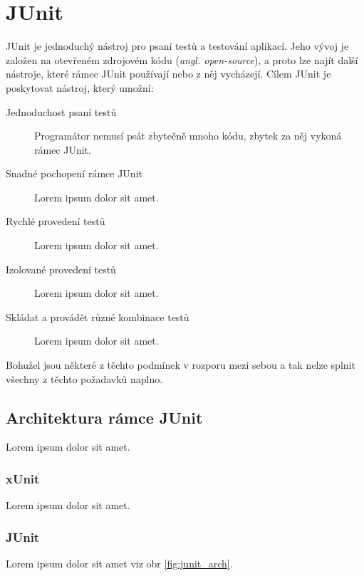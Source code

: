 \chapter{JUnit}                                                           %

JUnit je jednoduchý nástroj pro psaní testů a testování aplikací. Jeho vývoj je založen na otevřeném zdrojovém kódu (\emph{angl. open-source}), a proto lze najít další nástroje, které rámec JUnit používají nebo z něj vycházejí. Cílem JUnit je poskytovat nástroj, který umožní:
\begin{description}
  \item[Jednoduchost psaní testů]
  Programátor nemusí psát zbytečně mnoho kódu, zbytek za něj vykoná rámec JUnit.
  \item[Snadné pochopení rámce JUnit]
  Lorem ipsum dolor sit amet.
  \item[Rychlé provedení testů]
  Lorem ipsum dolor sit amet.
  \item[Izolované provedení testů]
  Lorem ipsum dolor sit amet.
  \item[Skládat a provádět různé kombinace testů]
  Lorem ipsum dolor sit amet.
\end{description}

Bohužel jsou některé z těchto podmínek v rozporu mezi sebou a tak nelze splnit všechny z těchto požadavků naplno.
  
  \section{Architektura rámce JUnit}
  Lorem ipsum dolor sit amet.

    \subsection{xUnit}
    Lorem ipsum dolor sit amet.

    \subsection{JUnit}
    Lorem ipsum dolor sit amet viz obr \ref{fig:junit_arch}.

